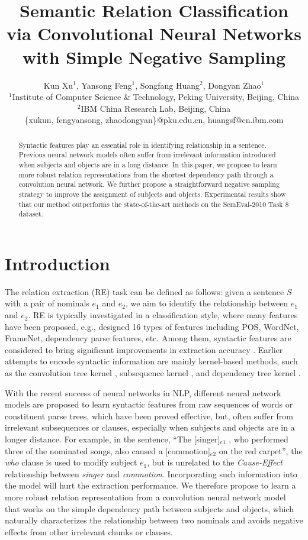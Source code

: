 \documentclass[11pt,a4paper]{article}
\title{Semantic Relation Classification via Convolutional Neural Networks with Simple Negative Sampling}
\author{Kun Xu$^{1}$, Yansong Feng$^{1}$, Songfang Huang$^{2}$, Dongyan Zhao$^{1}$\\
$^{1}$Institute of Computer Science \& Technology, Peking University, Beijing, China\\
$^{2}$IBM China Research Lab, Beijing, China \\
\{xukun, fengyansong, zhaodongyan\}@pku.edu.cn,  huangsf@cn.ibm.com\\
}
\date{}
\begin{document}
\maketitle
\begin{abstract}
Syntactic features play an essential role in identifying relationship in a sentence. Previous neural network models 
often suffer from irrelevant information introduced
when subjects and objects are in a long distance.  
In this paper, we propose to learn more robust relation representations from the shortest dependency path through a 
convolution neural network. We further propose
a straightforward negative sampling strategy to improve the assignment of subjects and objects.  
Experimental results show that our method outperforms the state-of-the-art methods on the SemEval-2010 Task 8 dataset.
\end{abstract}

\section{Introduction}
The relation extraction (RE) task can be defined as follows: given a sentence $S$ with a pair of nominals $e_1$ and $e_2$, we aim to identify the relationship between $e_1$ and $e_2$. RE is typically investigated in a classification style, where many features have been proposed, e.g.,  
designed 16 types of features including POS, WordNet, FrameNet, dependency parse features, etc. Among them,  syntactic features are considered to bring significant improvements in extraction accuracy \cite{DBLP:conf/naacl/BunescuM05}. Earlier attempts to encode syntactic information are mainly kernel-based methods, such as the convolution tree kernel \cite{DBLP:conf/coling/QianZKZQ08}, subsequence kernel \cite{DBLP:conf/nips/BunescuM05}, and dependency tree kernel \cite{DBLP:conf/naacl/BunescuM05}. 

With the recent success of neural networks in NLP, different neural network models are proposed to learn syntactic features from raw sequences of words or constituent parse trees\cite{zeng-EtAl:2014:Coling,DBLP:conf/emnlp/SocherHMN12}, which have been proved effective, but, often suffer from irrelevant subsequences or clauses, especially when subjects and objects are in a longer distance. For example, in the sentence, ``The [singer]$_{e1}$ , who performed three of the nominated songs, also caused a [commotion]$_{e2}$ on the red carpet'', the \textit{who} clause is used to modify subject $e_1$, but is unrelated to the \textit{Cause-Effect} relationship between \textit{singer} and \textit{commotion}. Incorporating such 
information into the model will hurt the extraction performance. We therefore propose to learn a more robust relation representation from a convolution neural network model that works on the simple dependency path between subjects and objects, which naturally characterizes the relationship between two nominals and avoids negative effects from other irrelevant chunks or clauses.
\end{document}
